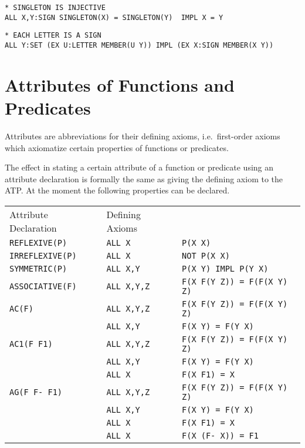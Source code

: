 \begin{verbatim}
* SINGLETON IS INJECTIVE
ALL X,Y:SIGN SINGLETON(X) = SINGLETON(Y)  IMPL X = Y
\end{verbatim}

\begin{verbatim}
* EACH LETTER IS A SIGN
ALL Y:SET (EX U:LETTER MEMBER(U Y)) IMPL (EX X:SIGN MEMBER(X Y))
\end{verbatim}

\section{Attributes of Functions and Predicates}
\label{AttributesofFunctionsandPredicates}

Attributes are abbreviations for their defining axioms, i.e.\ first-order 
axioms which axiomatize certain properties of functions or predicates. 

The effect in stating a certain attribute of a function or predicate using an 
attribute declaration is formally the same as giving the defining axiom to 
the ATP. At the moment the following properties can be declared. 

    
\begin{tabular}{lll}
Attribute Declaration &	Defining Axioms\\
{\tt REFLEXIVE(P)}&		{\tt ALL X}&	{\tt P(X X)}\\
{\tt IRREFLEXIVE(P)}&		{\tt ALL X}&	{\tt NOT P(X X)}\\
{\tt SYMMETRIC(P)}&		{\tt ALL X,Y}&	{\tt P(X Y) IMPL P(Y X)}\\
{\tt ASSOCIATIVE(F)}&		{\tt ALL X,Y,Z}&   {\tt F(X F(Y Z)) = F(F(X Y) Z)}\\
{\tt AC(F)}&		{\tt ALL X,Y,Z}&	{\tt F(X F(Y Z)) = F(F(X Y) Z)}\\
	&		{\tt ALL X,Y}&   	{\tt F(X Y) = F(Y X)}\\
{\tt AC1(F F1)}&		{\tt ALL X,Y,Z}&	{\tt F(X F(Y Z)) = F(F(X Y) Z)}\\
	&		{\tt ALL X,Y}&   {\tt F(X Y) = F(Y X)}\\
	&		{\tt ALL X}&   	 {\tt F(X F1) = X}\\
{\tt AG(F F- F1)}&	{\tt ALL X,Y,Z}& {\tt F(X F(Y Z)) = F(F(X Y) Z)}\\
	&		{\tt ALL X,Y}&   {\tt F(X Y) = F(Y X)}\\
	&		{\tt ALL X}&   	 {\tt F(X F1) = X}\\
	&		{\tt ALL X}&   	 {\tt F(X (F- X)) = F1}
\end{tabular}

